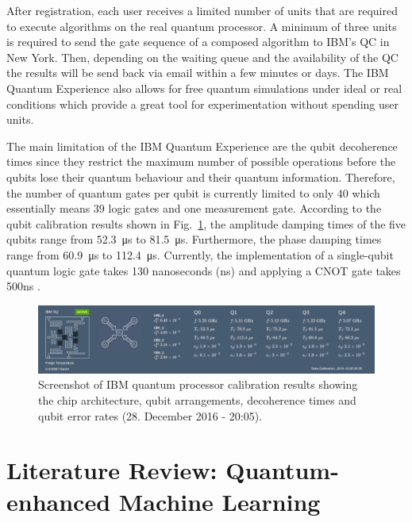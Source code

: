 After registration, each user receives a limited number of units that are required to execute algorithms on the real quantum processor. A minimum of three units is required to send the gate sequence of a composed algorithm to IBM's QC in New York. Then, depending on the waiting queue and the availability of the QC the results will be send back via email within a few minutes or days. The IBM Quantum Experience also allows for free quantum simulations under ideal or real conditions which provide a great tool for experimentation without spending user units.

The main limitation of the IBM Quantum Experience are the qubit decoherence times since they restrict the maximum number of possible operations before the qubits lose their quantum behaviour and their quantum information. Therefore, the number of quantum gates per qubit is currently limited to only 40 which essentially means 39 logic gates and one measurement gate. According to the qubit calibration results shown in Fig.~\ref{fig:calibration}, the amplitude damping times of the five qubits range from \SI{52.3}{\micro\second} to \SI{81.5}{\micro\second}. Furthermore, the phase damping times range from \SI{60.9}{\micro\second} to \SI{112.4}{\micro\second}. Currently, the implementation of a single-qubit quantum logic gate takes 130 nanoseconds (ns) and applying a CNOT gate takes 500ns \cite{ibmgatetimes}.

\begin{figure}[H]
      \centering
       \includegraphics[scale=0.33]{img/ibmcalibration.png}
       \caption[]{\label{fig:calibration} Screenshot of IBM quantum processor calibration results showing the chip architecture, qubit arrangements, decoherence times and qubit error rates (28. December 2016 - 20:05).\footnotemark[12]}
\end{figure}

\chapter{Literature Review: Quantum-enhanced Machine Learning}\label{sec:qml}

